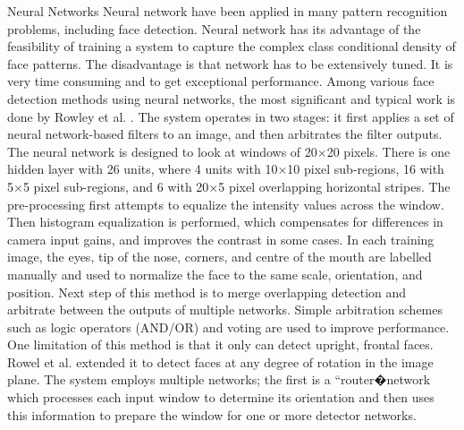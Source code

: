 Neural Networks
Neural network have been applied in many pattern recognition problems, including face detection. Neural network has its advantage of the feasibility of training a system to capture the complex class conditional density of face patterns. The disadvantage is that network has to be extensively tuned. It is very time consuming and to get exceptional performance. Among various face detection methods using neural networks, the most significant and typical work is done by Rowley et al. \cite{}. The system operates in two stages: it first applies a set of neural   network-based filters to an image, and then arbitrates the filter outputs. The neural network is designed to look at windows of 20×20 pixels. There is one hidden layer with 26 units, where 4 units with 10×10 pixel sub-regions, 16 with 5×5 pixel sub-regions, and 6 with 20×5 pixel overlapping horizontal stripes. The pre-processing first attempts to equalize the intensity values across the window. Then histogram equalization is performed, which compensates for differences in camera input gains, and improves the contrast in some cases. In each training image, the eyes, tip of the nose, corners, and centre of the mouth are labelled manually and used to normalize the face to the same scale, orientation, and position. Next step of this method is to merge overlapping detection and arbitrate between the outputs of multiple networks. Simple arbitration schemes such as logic operators (AND/OR) and voting are used to improve performance. One limitation of this method is that it only can detect upright, frontal faces. Rowel et al. \cite{} extended it to detect faces at any degree of rotation in the image plane. The system employs multiple networks; the first is a “router�network which processes each input window to determine its orientation and then uses this information to prepare the window for one or more detector networks.

